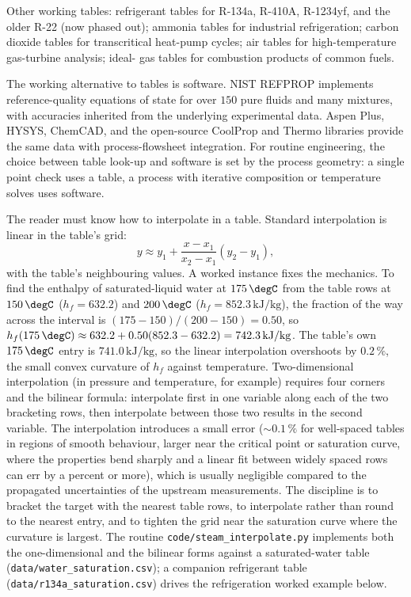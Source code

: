 Other working tables: refrigerant tables for R-134a, R-410A, R-1234yf,
and the older R-22 (now phased out); ammonia tables for industrial
refrigeration; carbon dioxide tables for transcritical heat-pump
cycles; air tables for high-temperature gas-turbine analysis; ideal-
gas tables for combustion products of common fuels.

The working alternative to tables is software. NIST REFPROP
implements reference-quality equations of state for over $150$ pure
fluids and many mixtures, with accuracies inherited from the
underlying experimental data. Aspen Plus, HYSYS, ChemCAD, and the
open-source CoolProp and Thermo libraries provide the same data with
process-flowsheet integration. For routine engineering, the choice
between table look-up and software is set by the process geometry: a
single point check uses a table, a process with iterative composition
or temperature solves uses software.

The reader must know how to interpolate in a table. Standard
interpolation is linear in the table's grid:
\[
y \approx y_1 + \frac{x - x_1}{x_2 - x_1}(y_2 - y_1),
\]
with the table's neighbouring values. A worked instance fixes the
mechanics. To find the enthalpy of saturated-liquid water at
$175\,\degC$ from the table rows at $150\,\degC$ ($h_f = 632.2$) and
$200\,\degC$ ($h_f = 852.3\,\text{kJ}/\text{kg}$), the fraction of the
way across the interval is $(175 - 150)/(200 - 150) = 0.50$, so
$h_f(175\,\degC) \approx 632.2 + 0.50(852.3 - 632.2) = 742.3\,\text{kJ}/
\text{kg}$. The table's own $175\,\degC$ entry is $741.0\,\text{kJ}/
\text{kg}$, so the linear interpolation overshoots by $0.2\,\%$, the
small convex curvature of $h_f$ against temperature. Two-dimensional
interpolation (in pressure and temperature, for example) requires four
corners and the bilinear formula: interpolate first in one variable along
each of the two bracketing rows, then interpolate between those two
results in the second variable. The interpolation introduces a small
error ($\sim 0.1\,\%$ for well-spaced tables in regions of smooth
behaviour, larger near the critical point or saturation curve, where the
properties bend sharply and a linear fit between widely spaced rows can
err by a percent or more), which is usually negligible compared to the
propagated uncertainties of the upstream measurements. The discipline is
to bracket the target with the nearest table rows, to interpolate rather
than round to the nearest entry, and to tighten the grid near the
saturation curve where the curvature is largest. The routine
\texttt{code/steam\_interpolate.py}
implements both the one-dimensional and the bilinear forms against a
saturated-water table (\texttt{data/water\_saturation.csv}); a companion
refrigerant table (\texttt{data/r134a\_saturation.csv}) drives the
refrigeration worked example below.

